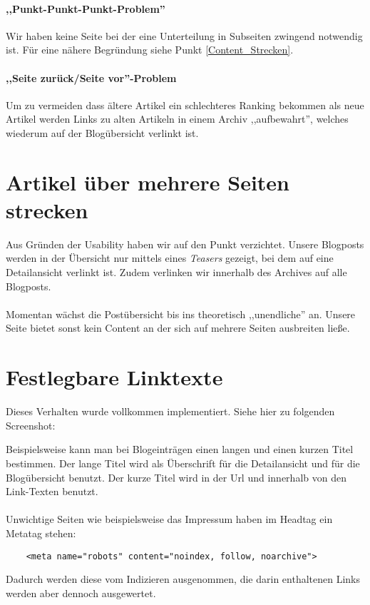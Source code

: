 \paragraph{,,Punkt-Punkt-Punkt-Problem''}
Wir haben keine Seite bei der eine Unterteilung in Subseiten zwingend notwendig
ist. Für eine nähere Begründung siehe Punkt \ref{Content_Strecken}.

\paragraph{,,Seite zurück/Seite vor''-Problem}
Um zu vermeiden dass ältere Artikel ein schlechteres Ranking bekommen als neue
Artikel werden Links zu alten Artikeln in einem Archiv ,,aufbewahrt'', welches
wiederum auf der Blogübersicht verlinkt ist.


\label{Content_Strecken}
\section{Artikel über mehrere Seiten strecken}
Aus Gründen der Usability haben wir auf den Punkt verzichtet. Unsere Blogposts
werden in der Übersicht nur mittels eines \emph{Teasers} gezeigt, bei dem auf
eine Detailansicht verlinkt ist. Zudem verlinken wir innerhalb des Archives auf
alle Blogposts. 
\\
\\
Momentan wächst die Postübersicht bis ins theoretisch ,,unendliche'' an.
Unsere Seite bietet sonst kein Content an der sich auf mehrere Seiten ausbreiten
ließe. 

\section{Festlegbare Linktexte}
Dieses Verhalten wurde vollkommen implementiert. Siehe hier  zu folgenden
Screenshot:

Beispielsweise kann man bei Blogeinträgen einen langen und einen kurzen Titel
bestimmen. Der lange Titel wird als Überschrift für die Detailansicht und für
die Blogübersicht benutzt. Der kurze Titel wird in der Url und innerhalb von den
Link-Texten benutzt. 
\\
\\
Unwichtige Seiten wie beispielsweise das Impressum haben im Headtag ein Metatag
stehen:
\begin{verbatim}
    <meta name="robots" content="noindex, follow, noarchive">
\end{verbatim}
Dadurch werden diese vom Indizieren ausgenommen, die darin enthaltenen Links
werden aber dennoch ausgewertet.

